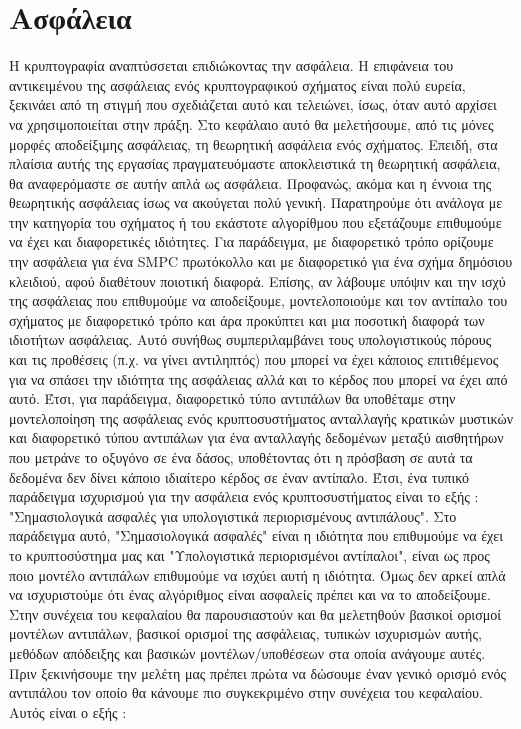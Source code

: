 \chapter{Ασφάλεια}
\label{chapter:security}

Η κρυπτογραφία αναπτύσσεται επιδιώκοντας την ασφάλεια. Η επιφάνεια του αντικειμένου της ασφάλειας ενός κρυπτογραφικού σχήματος είναι πολύ ευρεία, ξεκινάει από τη στιγμή που σχεδιάζεται αυτό και τελειώνει, ίσως, όταν αυτό αρχίσει να χρησιμοποιείται στην πράξη. Στο κεφάλαιο αυτό θα μελετήσουμε, από τις μόνες μορφές αποδείξιμης ασφάλειας, τη θεωρητική ασφάλεια ενός σχήματος. Επειδή, στα πλαίσια αυτής της εργασίας πραγματευόμαστε αποκλειστικά τη θεωρητική ασφάλεια, θα αναφερόμαστε σε αυτήν απλά ως ασφάλεια. Προφανώς, ακόμα και η έννοια της θεωρητικής ασφάλειας ίσως να ακούγεται πολύ γενική. Παρατηρούμε ότι ανάλογα με την κατηγορία του σχήματος ή του εκάστοτε αλγορίθμου που εξετάζουμε επιθυμούμε να έχει και διαφορετικές ιδιότητες. Για παράδειγμα, με διαφορετικό τρόπο ορίζουμε την ασφάλεια για ένα SMPC πρωτόκολλο και με διαφορετικό για ένα σχήμα δημόσιου κλειδιού, αφού διαθέτουν ποιοτική διαφορά. Επίσης, αν λάβουμε υπόψιν και την ισχύ της ασφάλειας που επιθυμούμε να αποδείξουμε, μοντελοποιούμε και τον αντίπαλο του σχήματος με διαφορετικό τρόπο και άρα προκύπτει και μια ποσοτική διαφορά των ιδιοτήτων ασφάλειας. Αυτό συνήθως συμπεριλαμβάνει τους υπολογιστικούς πόρους και τις προθέσεις (π.χ. να γίνει αντιληπτός) που μπορεί να έχει κάποιος επιτιθέμενος για να σπάσει την ιδιότητα της ασφάλειας αλλά και το κέρδος που μπορεί να έχει από αυτό. Έτσι, για παράδειγμα, διαφορετικό τύπο αντιπάλων θα υποθέταμε στην μοντελοποίηση της ασφάλειας ενός κρυπτοσυστήματος ανταλλαγής κρατικών μυστικών και διαφορετικό τύπου αντιπάλων για ένα ανταλλαγής δεδομένων μεταξύ αισθητήρων που μετράνε το οξυγόνο σε ένα δάσος, υποθέτοντας ότι η πρόσβαση σε αυτά τα δεδομένα δεν δίνει κάποιο ιδιαίτερο κέρδος σε έναν αντίπαλο. Έτσι, ένα τυπικό παράδειγμα ισχυρισμού για την ασφάλεια ενός κρυπτοσυστήματος είναι το εξής :
"Σημασιολογικά ασφαλές για υπολογιστικά περιορισμένους αντιπάλους". Στο παράδειγμα αυτό, "Σημασιολογικά ασφαλές" είναι η ιδιότητα που επιθυμούμε να έχει το κρυπτοσύστημα μας και "Υπολογιστικά περιορισμένοι αντίπαλοι", είναι ως προς ποιο μοντέλο αντιπάλων επιθυμούμε να ισχύει αυτή η ιδιότητα. Όμως δεν αρκεί απλά να ισχυριστούμε ότι ένας αλγόριθμος είναι ασφαλείς πρέπει και να το αποδείξουμε. Στην συνέχεια του κεφαλαίου θα παρουσιαστούν και θα μελετηθούν βασικοί ορισμοί μοντέλων αντιπάλων, βασικοί ορισμοί της ασφάλειας, τυπικών ισχυρισμών αυτής, μεθόδων απόδειξης και βασικών μοντέλων/υποθέσεων στα οποία ανάγουμε αυτές. Πριν ξεκινήσουμε την μελέτη μας πρέπει πρώτα να δώσουμε έναν γενικό ορισμό ενός αντιπάλου τον οποίο θα κάνουμε πιο συγκεκριμένο στην συνέχεια του κεφαλαίου. Αυτός είναι ο εξής :

